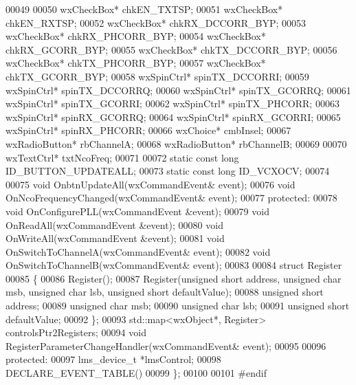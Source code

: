\begin{DoxyCode}
00049 
00050     wxCheckBox* chkEN_TXTSP;
00051     wxCheckBox* chkEN_RXTSP;
00052     wxCheckBox* chkRX_DCCORR_BYP;
00053     wxCheckBox* chkRX_PHCORR_BYP;
00054     wxCheckBox* chkRX_GCORR_BYP;
00055     wxCheckBox* chkTX_DCCORR_BYP;
00056     wxCheckBox* chkTX_PHCORR_BYP;
00057     wxCheckBox* chkTX_GCORR_BYP;
00058     wxSpinCtrl* spinTX_DCCORRI;
00059     wxSpinCtrl* spinTX_DCCORRQ;
00060     wxSpinCtrl* spinTX_GCORRQ;
00061     wxSpinCtrl* spinTX_GCORRI;
00062     wxSpinCtrl* spinTX_PHCORR;
00063     wxSpinCtrl* spinRX_GCORRQ;
00064     wxSpinCtrl* spinRX_GCORRI;
00065     wxSpinCtrl* spinRX_PHCORR;
00066     wxChoice* cmbInsel;
00067     wxRadioButton* rbChannelA;
00068     wxRadioButton* rbChannelB;
00069 
00070     wxTextCtrl* txtNcoFreq;
00071 
00072     \textcolor{keyword}{static} \textcolor{keyword}{const} \textcolor{keywordtype}{long} ID_BUTTON_UPDATEALL;
00073     \textcolor{keyword}{static} \textcolor{keyword}{const} \textcolor{keywordtype}{long} ID_VCXOCV;
00074 
00075     \textcolor{keywordtype}{void} OnbtnUpdateAll(wxCommandEvent& event);
00076     \textcolor{keywordtype}{void} OnNcoFrequencyChanged(wxCommandEvent& event);
00077 \textcolor{keyword}{protected}:
00078     \textcolor{keywordtype}{void} OnConfigurePLL(wxCommandEvent &event);
00079     \textcolor{keywordtype}{void} OnReadAll(wxCommandEvent &event);
00080     \textcolor{keywordtype}{void} OnWriteAll(wxCommandEvent &event);
00081     \textcolor{keywordtype}{void} OnSwitchToChannelA(wxCommandEvent& event);
00082     \textcolor{keywordtype}{void} OnSwitchToChannelB(wxCommandEvent& event);
00083 
00084     \textcolor{keyword}{struct }Register
00085     \{
00086         Register();
00087         Register(\textcolor{keywordtype}{unsigned} \textcolor{keywordtype}{short} address, \textcolor{keywordtype}{unsigned} \textcolor{keywordtype}{char} msb, \textcolor{keywordtype}{unsigned} \textcolor{keywordtype}{char} lsb, \textcolor{keywordtype}{unsigned} \textcolor{keywordtype}{short} 
      defaultValue);
00088         \textcolor{keywordtype}{unsigned} \textcolor{keywordtype}{short} address;
00089         \textcolor{keywordtype}{unsigned} \textcolor{keywordtype}{char} msb;
00090         \textcolor{keywordtype}{unsigned} \textcolor{keywordtype}{char} lsb;
00091         \textcolor{keywordtype}{unsigned} \textcolor{keywordtype}{short} defaultValue;
00092     \};
00093     std::map<wxObject*, Register> controlsPtr2Registers;
00094     \textcolor{keywordtype}{void} RegisterParameterChangeHandler(wxCommandEvent& event);
00095 
00096 \textcolor{keyword}{protected}:
00097     lms_device_t *lmsControl;
00098     DECLARE\_EVENT\_TABLE()
00099 \};
00100 
00101 \textcolor{preprocessor}{#endif}
\end{DoxyCode}
